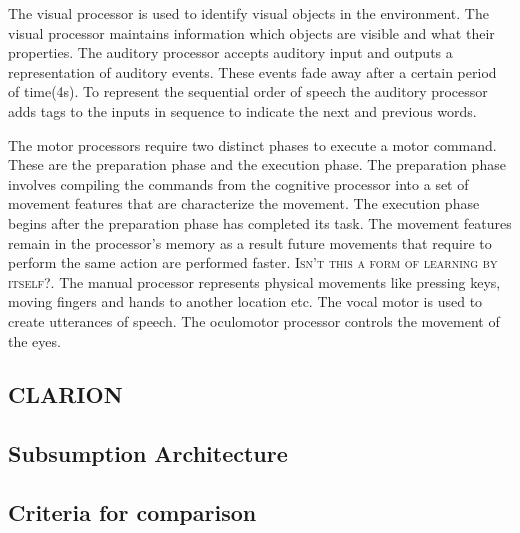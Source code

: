 The visual processor is used to identify visual objects in the
environment. The visual processor maintains information which objects
are visible and what their properties. The auditory processor accepts
auditory input and outputs a representation of auditory events. These
events fade away after a certain period of time(4s). To represent the
sequential order of speech the auditory processor adds tags to the
inputs in sequence to indicate the next and previous words.

The motor processors require two distinct phases to execute a motor
command. These are the preparation phase and the execution phase. The
preparation phase involves compiling the commands from the cognitive
processor into a set of movement features that are characterize the
movement. The execution phase begins after the preparation phase has
completed its task. The movement features remain in the processor's
memory as a result future movements that require to perform the same
action are performed faster. \textsc{Isn't this a form of learning by
  itself?}. The manual processor represents physical movements like
pressing keys, moving fingers and hands to another location etc. The
vocal motor is used to create utterances of speech. The oculomotor
processor controls the movement of the eyes.


\subsection{CLARION}
\subsection{Subsumption Architecture}

\subsection{Criteria for comparison}





